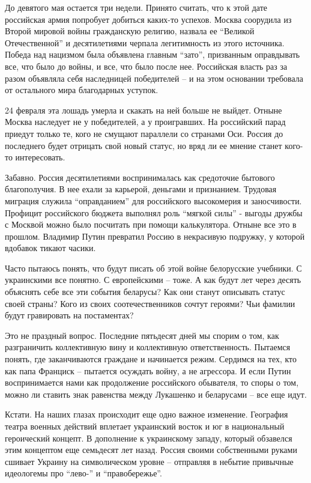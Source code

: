До девятого мая остается три недели. Принято считать, что к этой дате
российская армия попробует добиться каких-то успехов. Москва соорудила из
Второй мировой войны гражданскую религию, назвала ее \enquote{Великой Отечественной} и
десятилетиями черпала легитимность из этого источника. Победа над нацизмом была
объявлена главным \enquote{зато}, призванным оправдывать все, что было до войны, и все,
что было после нее. Российская власть раз за разом объявляла себя наследницей
победителей – и на этом основании требовала от остального мира благодарных
уступок.

24 февраля эта лошадь умерла и скакать на ней больше не выйдет. Отныне Москва
наследует не у победителей, а у проигравших. На российский парад приедут только
те, кого не смущают параллели со странами Оси. Россия до последнего будет
отрицать свой новый статус, но вряд ли ее мнение станет кого-то интересовать.  

Забавно. Россия десятилетиями воспринималась как средоточие бытового
благополучия. В нее ехали за карьерой, деньгами и признанием. Трудовая миграция
служила \enquote{оправданием} для российского высокомерия и заносчивости. Профицит
российского бюджета выполнял роль \enquote{мягкой силы} - выгоды дружбы с Москвой можно
было посчитать при помощи калькулятора. Отныне все это в прошлом. Владимир
Путин превратил Россию в некрасивую подружку, у которой вдобавок тикают часики.

Часто пытаюсь понять, что будут писать об этой войне белорусские учебники. С
украинскими все понятно. С европейскими – тоже. А как будут лет через десять
объяснять себе все эти события беларусы? Как они станут описывать статус своей
страны? Кого из своих соотечественников сочтут героями? Чьи фамилии будут
гравировать на постаментах?

Это не праздный вопрос. Последние пятьдесят дней мы спорим о том, как
разграничить коллективную вину и коллективную ответственность. Пытаемся понять,
где заканчиваются граждане и начинается режим. Сердимся на тех, кто как папа
Франциск – пытается осуждать войну, а не агрессора. И если Путин воспринимается
нами как продолжение российского обывателя, то споры о том, можно ли ставить
знак равенства между Лукашенко и беларусами – все еще идут.

Кстати. На наших глазах происходит еще одно важное изменение. География театра
военных действий вплетает украинский восток и юг в национальный героический
концепт. В дополнение к украинскому западу, который обзавелся этим концептом
еще семьдесят лет назад. Россия своими собственными руками сшивает Украину на
символическом уровне – отправляя в небытие привычные идеологемы про \enquote{лево-} и
\enquote{правобережье}.

